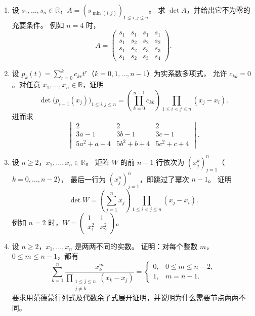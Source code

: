 \documentclass[UTF8,12pt,a4paper,fontset=fandol]{ctexart}
\begin{document}
\begin{enumerate}[label=\arabic*.,resume=detquestions]
\item\label{q:min-index}
设 $s_1,\ldots,s_n\in\mathbb R$，$A=(s_{\min(i,j)})_{1\leq i,j\leq n}$。
求 $\det A$，并给出它不为零的充要条件。
例如 $n=4$ 时，
\[
A=\begin{pmatrix}
s_1&s_1&s_1&s_1\\
s_1&s_2&s_2&s_2\\
s_1&s_2&s_3&s_3\\
s_1&s_2&s_3&s_4
\end{pmatrix}.
\]

\item\label{q:polynomial-basis}
设 $p_k(t)=\sum_{r=0}^{k}c_{kr}t^r$（$k=0,1,\ldots,n-1$）为实系数多项式，
允许 $c_{kk}=0$。对任意 $x_1,\ldots,x_n\in\mathbb R$，证明
\[
\det\bigl(p_{i-1}(x_j)\bigr)_{1\leq i,j\leq n}
=\left(\prod_{k=0}^{n-1}c_{kk}\right)
\prod_{1\leq i<j\leq n}(x_j-x_i).
\]
进而求
\[
\begin{vmatrix}
2&2&2\\
3a-1&3b-1&3c-1\\
5a^2+a+4&5b^2+b+4&5c^2+c+4
\end{vmatrix}.
\]

\item\label{q:missing-power}
设 $n\geq2$，$x_1,\ldots,x_n\in\mathbb R$。
矩阵 $W$ 的前 $n-1$ 行依次为 $(x_j^k)_{j=1}^n$（$k=0,\ldots,n-2$），
最后一行为 $(x_j^n)_{j=1}^n$，即跳过了幂次 $n-1$。
证明
\[
\det W=\left(\sum_{j=1}^n x_j\right)
\prod_{1\leq i<j\leq n}(x_j-x_i).
\]
例如 $n=2$ 时，$W=\begin{pmatrix}1&1\\x_1^2&x_2^2\end{pmatrix}$。

\item\label{q:interpolation-sum}
设 $n\geq2$，$x_1,\ldots,x_n$ 是两两不同的实数。
证明：对每个整数 $m$，$0\leq m\leq n-1$，都有
\[
\sum_{k=1}^n
\frac{x_k^m}{\displaystyle\prod_{\substack{1\leq j\leq n\\j\ne k}}(x_k-x_j)}
=\begin{cases}0,&0\leq m\leq n-2,\\1,&m=n-1.\end{cases}
\]
要求用范德蒙行列式及代数余子式展开证明，并说明为什么需要节点两两不同。
\end{enumerate}
\end{document}
